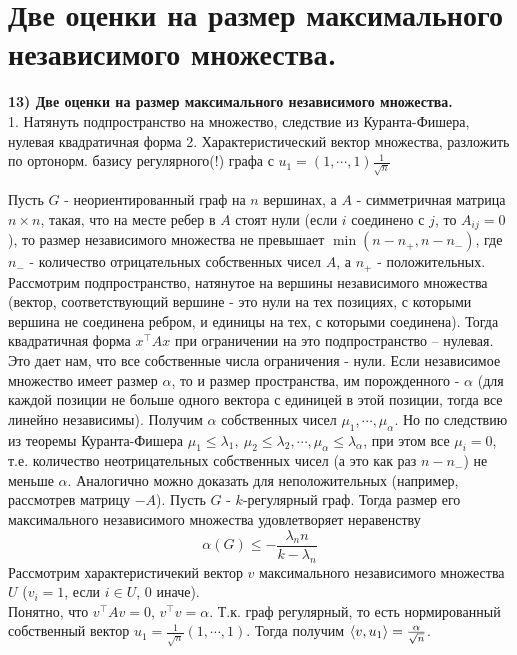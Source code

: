 \section{
  Две оценки на размер максимального независимого множества.
}

\textbf{13)  Две оценки на размер максимального независимого множества.}\\
    
    1. Натянуть подпространство на  множество, следствие из Куранта-Фишера, нулевая квадратичная форма
    2. Характеристический вектор множества, разложить по ортонорм. базису регулярного(!) графа с $u_1 = (1,\cdots,1) \frac{1}{\sqrt n}$
    
    
    \thrm Пусть $G$ - неориентированный граф на $n$ вершинах, а $A$ - симметричная матрица $n \times n$, такая, что на месте ребер в $A$ стоят нули (если $i$ соединено с $j$, то $A_{ij} = 0$), то размер независимого множества не превышает $\min(n - n_{+}, n-n_{-})$, где $n_{-}$ - количество отрицательных собственных чисел $A$, а $n_{+}$ - положительных.
    \ethrm
    \proof
    Рассмотрим подпространство, натянутое на вершины независимого множества (вектор, соответствующий вершине - это нули на тех позициях, с которыми вершина не соединена ребром, и единицы на тех, с которыми соединена). Тогда квадратичная форма $x^{\top}Ax$ при ограничении на это подпространство -- нулевая. Это дает нам, что все собственные числа ограничения - нули. Если независимое множество имеет размер $\alpha$, то и размер пространства, им порожденного - $\alpha$ (для каждой позиции не больше одного вектора с единицей в этой позиции, тогда все линейно независимы). Получим $\alpha$ собственных чисел $\mu_1, \cdots, \mu_{\alpha}$. Но по следствию из теоремы Куранта-Фишера $\mu_1 \le \lambda_1,\: \mu_2 \le \lambda_2, \cdots,\mu_{\alpha} \le \lambda_{\alpha}$, при этом все $\mu_i = 0$, т.е. количество неотрицательных собственных чисел (а это как раз $n - n_{-}$) не меньше $\alpha$. Аналогично можно доказать для неположительных (например, рассмотрев матрицу $-A$).
    \endproof
    \thrm Пусть $G$ - $k$-регулярный граф. Тогда размер его максимального независимого множества удовлетворяет неравенству
    $$\alpha(G) \le - \frac{\lambda_n n}{k - \lambda_n}$$
    \ethrm
    \proof
        Рассмотрим характеристичекий вектор $v$ максимального независимого множества $U$ ($v_i = 1$, если $i \in U$, 0 иначе).\\
        Понятно, что $v^{\top}Av = 0$, $v^{\top}v = \alpha$. Т.к. граф регулярный, то есть нормированный собственный вектор $u_1 = \frac{1}{\sqrt{n}}(1,\cdots,1)$. Тогда получим $\left\langle v, u_1 \right\rangle = \frac{\alpha}{\sqrt n}$.\\
